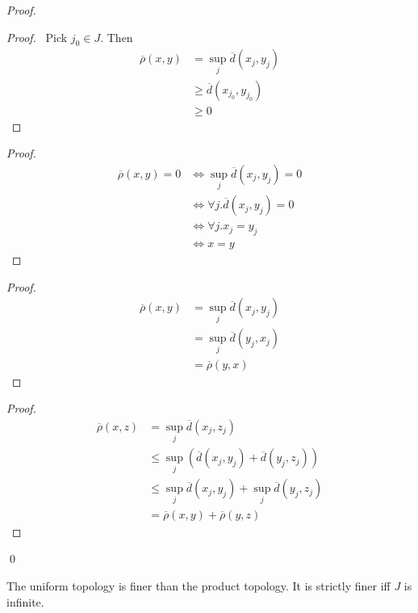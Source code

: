 \begin{proof}
\pf
{}
\begin{proof}
	\pf\ Pick $j_0 \in J$. Then
	\begin{align*}
		\overline{\rho}(x,y) & = \sup_j \overline{d}(x_j,y_j) \\
		& \geq \overline{d}(x_{j_0},y_{j_0}) \\
		& \geq 0
	\end{align*}
\end{proof}
\begin{proof}
	\pf
	\begin{align*}
		\overline{\rho}(x,y) = 0 & \Leftrightarrow \sup_j \overline{d}(x_j,y_j) = 0 \\
		& \Leftrightarrow \forall j. \overline{d}(x_j,y_j) = 0 \\
		& \Leftrightarrow \forall j. x_j = y_j \\
		& \Leftrightarrow x = y
	\end{align*}
\end{proof}
\begin{proof}
	\pf
	\begin{align*}
		\overline{\rho}(x,y) & = \sup_j \overline{d}(x_j,y_j) \\
		& = \sup_j \overline{d}(y_j,x_j) \\
		& = \overline{\rho}(y,x)
	\end{align*}
\end{proof}
\begin{proof}
	\pf
	\begin{align*}
		\overline{\rho}(x,z) & = \sup_j \overline{d}(x_j,z_j) \\
		& \leq \sup_j (\overline{d}(x_j,y_j) + \overline{d}(y_j,z_j)) \\
		& \leq \sup_j \overline{d}(x_j,y_j) + \sup_j \overline{d}(y_j,z_j) \\
		& = \overline{\rho}(x,y) + \overline{\rho}(y,z)
	\end{align*}
\end{proof}
\qed
\end{proof}

\begin{prop}
The uniform topology is finer than the product topology. It is strictly finer iff $J$ is infinite.
\end{prop}

